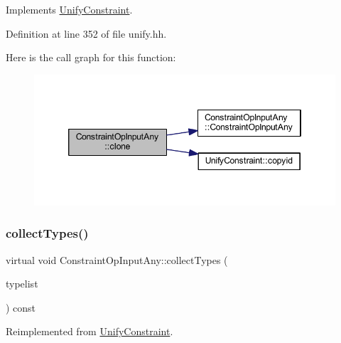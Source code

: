 Implements \mbox{\hyperlink{class_unify_constraint_a4f068343932637d355644bb21559aa12}{Unify\+Constraint}}.



Definition at line 352 of file unify.\+hh.

Here is the call graph for this function\+:
\nopagebreak
\begin{figure}[H]
\begin{center}
\leavevmode
\includegraphics[width=346pt]{class_constraint_op_input_any_acb465f5609db781a6d04aa6305964a7a_cgraph}
\end{center}
\end{figure}
\mbox{\label{class_constraint_op_input_any_a80046f2931dd2b9bfdc0e3e04a57c00c}} 
\subsubsection{\texorpdfstring{collectTypes()}{collectTypes()}}
{\footnotesize\ttfamily virtual void Constraint\+Op\+Input\+Any\+::collect\+Types (\begin{DoxyParamCaption}\item[{vector$<$ \mbox{\hyperlink{class_unify_datatype}{Unify\+Datatype}} $>$ \&}]{typelist }\end{DoxyParamCaption}) const\hspace{0.3cm}{\ttfamily [virtual]}}



Reimplemented from \mbox{\hyperlink{class_unify_constraint_acb83b6bea3b21e13054e72ac9cfaba0f}{Unify\+Constraint}}.

\mbox{\label{class_constraint_op_input_any_a41c3e27075116062a4fde2c3da29013e}} 
